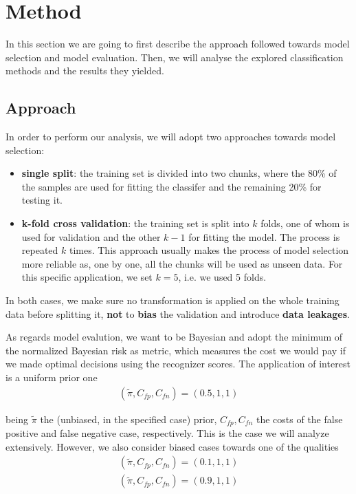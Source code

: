 \section{Method}
In this section we are going to first describe the approach followed towards model selection and model evaluation. Then, we will analyse the explored classification methods and the results they yielded.
 
\subsection{Approach}
In order to perform our analysis, we will adopt two approaches towards model selection:
\begin{itemize}
	\item \textbf{single split}: the training set is divided into two chunks, where the 80\% of the samples are used for fitting the classifer and the remaining 20\% for testing it. 
	\item \textbf{k-fold cross validation}: the training set is split into $k$ folds, one of whom is used for validation and the other $k - 1$ for fitting the model. The process is repeated $k$ times. This approach usually makes the process of model selection more reliable as, one by one, all the chunks will be used as unseen data. 
	For this specific application, we set $k = 5$, i.e. we used 5 folds. 
	
\end{itemize}
In both cases, we make sure no transformation is applied on the whole training data before splitting it, \textbf{not} to \textbf{bias} the validation and introduce \textbf{data leakages}.  

As regards model evalution, we want to be Bayesian and adopt the minimum of the normalized Bayesian risk as metric, which measures the cost we would pay if we made optimal decisions using the recognizer scores. The application of interest is a uniform prior one
\begin{align*}
	(\tilde{\pi}, C_{fp}, C_{fn}) = (0.5, 1, 1)
\end{align*}

being $\tilde{\pi}$ the (unbiased, in the specified case) prior, $C_{fp}, C_{fn}$ the costs of the false positive and false negative case, respectively. This is the case we will analyze extensively.  However, we also consider biased cases towards one of the qualities
\begin{align*}
	(\tilde{\pi}, C_{fp}, C_{fn}) = (0.1, 1, 1) \\
	(\tilde{\pi}, C_{fp}, C_{fn}) = (0.9, 1, 1)
\end{align*}


